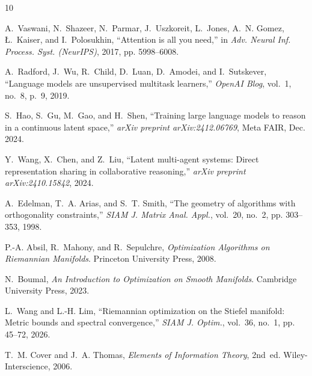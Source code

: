 \documentclass[journal,twocolumn]{IEEEtran}
\begin{document}

\begin{thebibliography}{10}

A.~Vaswani, N.~Shazeer, N.~Parmar, J.~Uszkoreit, L.~Jones, A.~N. Gomez, {\L}.~Kaiser, and I.~Polosukhin,
\newblock ``Attention is all you need,''
\newblock in \emph{Adv. Neural Inf. Process. Syst. (NeurIPS)}, 2017, pp. 5998--6008.

A.~Radford, J.~Wu, R.~Child, D.~Luan, D.~Amodei, and I.~Sutskever,
\newblock ``Language models are unsupervised multitask learners,''
\newblock \emph{OpenAI Blog}, vol.~1, no.~8, p.~9, 2019.

S.~Hao, S.~Gu, M.~Gao, and H.~Shen,
\newblock ``Training large language models to reason in a continuous latent space,''
\newblock \emph{arXiv preprint arXiv:2412.06769}, Meta FAIR, Dec. 2024.

Y.~Wang, X.~Chen, and Z.~Liu,
\newblock ``Latent multi-agent systems: Direct representation sharing in collaborative reasoning,''
\newblock \emph{arXiv preprint arXiv:2410.15842}, 2024.

A.~Edelman, T.~A. Arias, and S.~T. Smith,
\newblock ``The geometry of algorithms with orthogonality constraints,''
\newblock \emph{SIAM J. Matrix Anal. Appl.}, vol.~20, no.~2, pp. 303--353, 1998.

P.-A. Absil, R.~Mahony, and R.~Sepulchre,
\newblock \emph{Optimization Algorithms on Riemannian Manifolds}.
\newblock Princeton University Press, 2008.

N.~Boumal,
\newblock \emph{An Introduction to Optimization on Smooth Manifolds}.
\newblock Cambridge University Press, 2023.

L.~Wang and L.-H. Lim,
\newblock ``Riemannian optimization on the Stiefel manifold: Metric bounds and spectral convergence,''
\newblock \emph{SIAM J. Optim.}, vol.~36, no.~1, pp. 45--72, 2026.

T.~M. Cover and J.~A. Thomas,
\newblock \emph{Elements of Information Theory}, 2nd~ed.
\newblock Wiley-Interscience, 2006.

\end{thebibliography}
\end{document}
